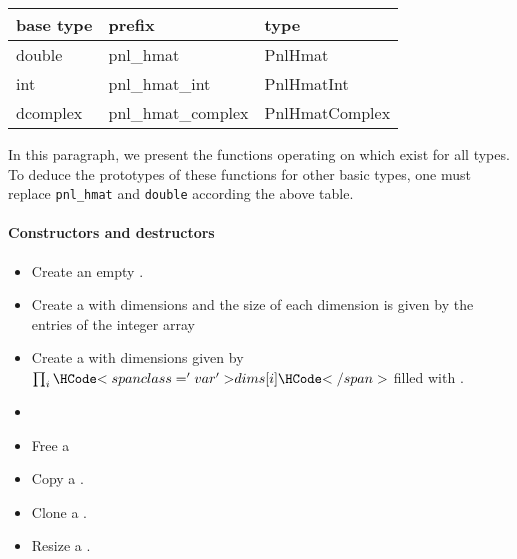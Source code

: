 \begin{center}
  \begin{tabular}[t]{lll}
    base type & prefix & type\\
    \hline
    double & pnl_hmat & PnlHmat \\
    \hline
    int & pnl_hmat_int & PnlHmatInt \\
    \hline
    dcomplex & pnl_hmat_complex & PnlHmatComplex
  \end{tabular}
\end{center}

In this paragraph, we present the functions operating on \PnlHmat
which exist for all types. To deduce the prototypes of these functions for
other basic types, one must replace {\tt pnl_hmat} and {\tt double} according
the above table.


\paragraph{Constructors and destructors}
\begin{itemize}
  \item {}
    \sshortdescribe Create an empty \PnlHmat.

\item {}
  \sshortdescribe Create a \PnlHmat with  dimensions and
  the size of each dimension is given by the entries of the integer array
  
\item 
  \sshortdescribe Create a \PnlHmat with  dimensions given
  by $\prod_i \var{dims[i]}$ filled with .
  
\item 
  
\item {}
  \sshortdescribe Free a \PnlHmat
  
\item {}
  \sshortdescribe Copy a \PnlHmat.
  
\item {}
  \sshortdescribe Clone a \PnlHmat.
  
\item {}
  \sshortdescribe Resize a \PnlHmat.
\end{itemize}  

